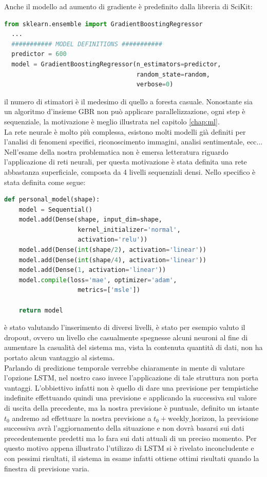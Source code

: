 \documentclass[%
    corpo=12pt,
    twoside,
    oldstyle,
    autoretitolo,
    greek,
    evenboxes,
]{toptesi}
\begin{document}
Anche il modello ad aumento di gradiente è predefinito dalla libreria di SciKit:
\begin{lstlisting}[language=Python, frame=single, basicstyle=\small]
  from sklearn.ensemble import GradientBoostingRegressor
  ...
  ########### MODEL DEFINITIONS ###########
  predictor = 600
  model = GradientBoostingRegressor(n_estimators=predictor,
                                    random_state=random, 
                                    verbose=0)
\end{lstlisting}
il numero di stimatori è il medesimo di quello a foresta casuale. Nonostante sia un algoritmo d'insieme GBR non può applicare parallelizzazione, ogni step è sequenziale, la motivazione è meglio illustrata nel capitolo \ref{chap:ml}.\\
La rete neurale è molto più complessa, esistono molti modelli già definiti per l'analisi di fenomeni specifici, riconoscimento immagini, analisi sentimentale, ecc... Nell'esame della nostra problematica non è emersa letteratura riguardo l'applicazione di reti neurali, per questa motivazione è stata definita una rete abbastanza superficiale, composta da 4 livelli sequenziali densi. Nello specifico è stata definita come segue:
\begin{lstlisting}[language=Python, frame=single, basicstyle=\small]
  def personal_model(shape):
    model = Sequential()
    model.add(Dense(shape, input_dim=shape, 
                    kernel_initializer='normal', 
                    activation='relu'))
    model.add(Dense(int(shape/2), activation='linear'))
    model.add(Dense(int(shape/4), activation='linear'))
    model.add(Dense(1, activation='linear'))
    model.compile(loss='mae', optimizer='adam', 
                    metrics=['msle'])

    return model
\end{lstlisting}
è stato valutando l'inserimento di diversi livelli, è stato per esempio valuto il dropout, ovvero un livello che casualmente spegnesse alcuni neuroni al fine di aumentare la casualità del sistema ma, vista la contenuta quantità di dati, non ha portato alcun vantaggio al sistema.\\
Parlando di predizione temporale verrebbe chiaramente in mente di valutare l'opzione LSTM, nel nostro caso invece l'applicazione di tale struttura non porta vantaggi. L'obbiettivo infatti non è quello di dare una previsione per tempistiche indefinite effettuando quindi una previsione e applicando la successiva sul valore di uscita della precedente, ma la nostra previsione è puntuale, definito un istante $t_0$ andremo ad effettuare la nostra previsione a $t_0 + \textrm{weekly\_horizon}$, la previsione successiva avrà l'aggiornamento della situazione e non dovrà basarsi sui dati precedentemente predetti ma lo fara sui dati attuali di un preciso momento. Per questo motivo appena illustrato l'utilizzo di LSTM si è rivelato inconcludente e con pessimi risultati, il sistema in esame infatti ottiene ottimi risultati quando la finestra di previsione varia.
\end{document}
